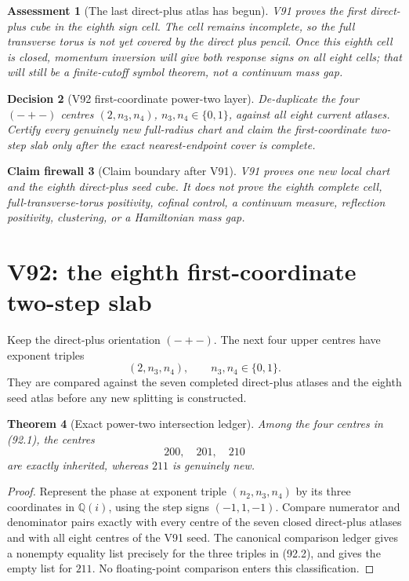 \documentclass[11pt,oneside]{article}
\newtheorem{theorem}{Theorem}[section]
\newtheorem{assessment}[theorem]{Assessment}
\newtheorem{firewall}[theorem]{Claim firewall}
\newtheorem{decision}[theorem]{Decision}
\theoremstyle{definition}
\theoremstyle{remark}
\begin{document}
\begin{assessment}[The last direct-plus atlas has begun]
\label{ass:newv91}
V91 proves the first direct-plus cube in the eighth sign cell.  The
cell remains incomplete, so the full transverse torus is not yet
covered by the direct plus pencil.  Once this eighth cell is closed,
momentum inversion will give both response signs on all eight cells;
that will still be a finite-cutoff symbol theorem, not a continuum
mass gap.
\end{assessment}

\begin{decision}[V92 first-coordinate power-two layer]
\label{dec:newv91-next}
De-duplicate the four \((-+-)\) centres
\((2,n_3,n_4)\), \(n_3,n_4\in\{0,1\}\), against all eight current
atlases.  Certify every genuinely new full-radius chart and claim
the first-coordinate two-step slab only after the exact
nearest-endpoint cover is complete.
\end{decision}

\begin{firewall}[Claim boundary after V91]
\label{fire:newv91-final}
V91 proves one new local chart and the eighth direct-plus seed cube.
It does not prove the eighth complete cell, full-transverse-torus
positivity, cofinal control, a continuum measure, reflection
positivity, clustering, or a Hamiltonian mass gap.
\end{firewall}

\section{V92: the eighth first-coordinate two-step slab}
\label{sec:newv92-eighth-first-two-step}

Keep the direct-plus orientation \((-+-)\).  The next four upper
centres have exponent triples
\[
 (2,n_3,n_4),\qquad n_3,n_4\in\{0,1\}.              \tag{92.1}
\]
They are compared against the seven completed direct-plus atlases
and the eighth seed atlas before any new splitting is constructed.

\begin{theorem}[Exact power-two intersection ledger]
\label{thm:newv92-intersection}
Among the four centres in (92.1), the centres
\[
 200,\quad201,\quad210                                \tag{92.2}
\]
are exactly inherited, whereas \(211\) is genuinely new.
\end{theorem}

\begin{proof}
Represent the phase at exponent triple \((n_2,n_3,n_4)\) by its
three coordinates in \(\mathbb Q(i)\), using the step signs
\((-1,1,-1)\).  Compare numerator and denominator pairs exactly
with every centre of the seven closed direct-plus atlases and with
all eight centres of the V91 seed.  The canonical comparison ledger
gives a nonempty equality list precisely for the three triples in
(92.2), and gives the empty list for \(211\).  No floating-point
comparison enters this classification.
\end{proof}
\end{document}

